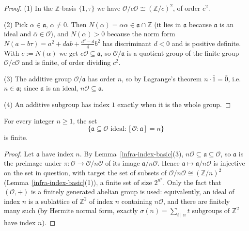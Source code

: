 \begin{proof}
  (1) In the $\mathbb{Z}$-basis $\{1, \tau\}$ we have
  $\mathcal{O}/c\mathcal{O} \cong (\mathbb{Z}/c)^2$, of order $c^2$.

  (2) Pick $\alpha \in \mathfrak{a}$, $\alpha \ne 0$. Then
  $N(\alpha) = \alpha\bar{\alpha} \in \mathfrak{a} \cap \mathbb{Z}$ (it lies in
  $\mathfrak{a}$ because $\mathfrak{a}$ is an ideal and $\bar{\alpha} \in \mathcal{O}$), and
  $N(\alpha) > 0$ because the norm form
  $N(a + b\tau) = a^2 + dab + \tfrac{d^2-d}{4}b^2$ has discriminant $d < 0$ and is positive
  definite. With $c := N(\alpha)$ we get $c\mathcal{O} \subseteq \mathfrak{a}$, so
  $\mathcal{O}/\mathfrak{a}$ is a quotient group of the finite group
  $\mathcal{O}/c\mathcal{O}$ and is finite, of order dividing $c^2$.

  (3) The additive group $\mathcal{O}/\mathfrak{a}$ has order $n$, so by Lagrange's theorem
  $n \cdot \bar{1} = \bar{0}$, i.e.\ $n \in \mathfrak{a}$; since $\mathfrak{a}$ is an ideal,
  $n\mathcal{O} \subseteq \mathfrak{a}$.

  (4) An additive subgroup has index $1$ exactly when it is the whole group.
\end{proof}

\begin{lemma}\label{infra-index-finite}
  \leanok
  For every integer $n \ge 1$, the set
  \[
    \{\mathfrak{a} \subseteq \mathcal{O} \text{ ideal} :
      [\mathcal{O} : \mathfrak{a}] = n\}
  \]
  is finite.
\end{lemma}

\begin{proof}
  Let $\mathfrak{a}$ have index $n$. By Lemma~\ref{infra-index-basic}(3),
  $n\mathcal{O} \subseteq \mathfrak{a} \subseteq \mathcal{O}$, so $\mathfrak{a}$ is the
  preimage under $\pi : \mathcal{O} \to \mathcal{O}/n\mathcal{O}$ of its image
  $\mathfrak{a}/n\mathcal{O}$. Hence $\mathfrak{a} \mapsto \mathfrak{a}/n\mathcal{O}$ is
  injective on the set in question, with target the set of subsets of
  $\mathcal{O}/n\mathcal{O} \cong (\mathbb{Z}/n)^2$
  (Lemma~\ref{infra-index-basic}(1)), a finite set of size $2^{n^2}$. Only the fact that
  $(\mathcal{O}, +)$ is a finitely generated abelian group is used: equivalently, an ideal
  of index $n$ is a sublattice of $\mathbb{Z}^2$ of index $n$ containing $n\mathcal{O}$, and
  there are finitely many such (by Hermite normal form, exactly
  $\sigma(n) = \sum_{t \mid n} t$ subgroups of $\mathbb{Z}^2$ have index $n$).
\end{proof}

